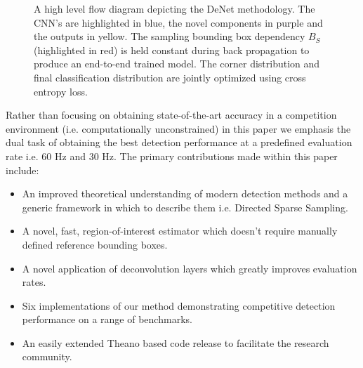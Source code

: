\documentclass[10pt,twocolumn]{article}
\begin{document}
\begin{figure}[tb]
\centering
{}
\caption{A high level flow diagram depicting the DeNet methodology. The CNN's are highlighted in blue, the novel components in purple and the outputs in yellow. The sampling bounding box dependency $B_S$ (highlighted in red) is held constant during back propagation to produce an end-to-end trained model. The corner distribution and final classification distribution are jointly optimized using cross entropy loss. }
\end{figure}
\newpage 
Rather than focusing on obtaining state-of-the-art accuracy in a competition environment (i.e. computationally unconstrained) in this paper we emphasis the dual task of obtaining the best detection performance at a predefined evaluation rate i.e. 60 Hz and 30 Hz. The primary contributions made within this paper include:
\begin{itemize}
\item An improved theoretical understanding of modern detection methods and a generic framework in which to describe them i.e. Directed Sparse Sampling.
\item A novel, fast, region-of-interest estimator which doesn't require manually defined reference bounding boxes.  
\item A novel application of deconvolution layers which greatly improves evaluation rates. 
\item Six implementations of our method demonstrating competitive detection performance on a range of benchmarks. 
\item An easily extended Theano based code release to facilitate the research community.
\end{itemize}
\end{document}
